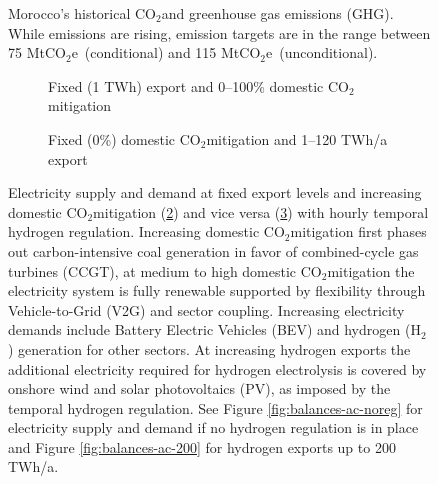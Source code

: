 \documentclass[5p,numafflabel]{elsarticle}
\newcommand{\co}{\ce{CO2}~}
\def\co{CO${}_2${\:}}
\def\coe{CO${}_2$e}
\begin{document}
\begin{figure}[h!]
    \centering
    \caption{Morocco's historical \co and greenhouse gas emissions (GHG). While emissions are rising, emission targets are in the range between 75 Mt\coe\ (conditional) and 115 Mt\coe\ (unconditional)\cite{CAT2021}.}
    \label{fig:morocco_em}
\end{figure}

\begin{figure}[h!]
    \centering
    \begin{subfigure}[b]{0.49\linewidth}
        \centering
        \caption{Fixed (1 TWh) export and 0--100\% domestic \co mitigation}
        \label{fig:balances-ac-0exp-120}
    \end{subfigure}
    \hfill
    \begin{subfigure}[b]{0.49\linewidth}
        \centering
        \caption{Fixed (0\%) domestic \co mitigation and 1--120 TWh/a export}
        \label{fig:balances-ac-co2l20-120}
    \end{subfigure}
    \hfill
    \caption{Electricity supply and demand at fixed export levels and increasing domestic \co mitigation (\ref{fig:balances-ac-0exp-120}) and vice versa (\ref{fig:balances-ac-co2l20-120}) with hourly temporal hydrogen regulation. Increasing domestic \co mitigation first phases out carbon-intensive coal generation in favor of combined-cycle gas turbines (CCGT), at medium to high domestic \co mitigation the electricity system is fully renewable supported by flexibility through Vehicle-to-Grid (V2G) and sector coupling. Increasing electricity demands include Battery Electric Vehicles (BEV) and hydrogen ({H${}_2${}}) generation for other sectors.
    At increasing hydrogen exports the additional electricity required for hydrogen electrolysis is covered by onshore wind and solar photovoltaics (PV), as imposed by the temporal hydrogen regulation. 
    See Figure \ref{fig:balances-ac-noreg} for electricity supply and demand if no hydrogen regulation is in place and Figure \ref{fig:balances-ac-200} for hydrogen exports up to 200 TWh/a.
    }
    \label{fig:balances-ac}
\end{figure}
\end{document}
